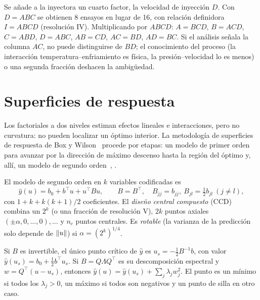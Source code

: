 \begin{ejemplo}\label{ej:fraccion}
Se añade a la inyectora un cuarto factor, la velocidad de inyección $D$. Con $D=ABC$ se obtienen 8 ensayos en lugar de 16, con relación definidora $I=ABCD$ (resolución IV). Multiplicando por $ABCD$: $A=BCD$, $B=ACD$, $C=ABD$, $D=ABC$, $AB=CD$, $AC=BD$, $AD=BC$. Si el análisis señala la columna $AC$, no puede distinguirse de $BD$; el conocimiento del proceso (la interacción temperatura--enfriamiento es física, la presión--velocidad lo es menos) o una segunda fracción deshacen la ambigüedad.
\end{ejemplo}

\section{Superficies de respuesta}

Los factoriales a dos niveles estiman efectos lineales e interacciones, pero no curvatura: no pueden localizar un óptimo interior. La metodología de superficies de respuesta de Box y Wilson~\cite{boxwilson} procede por etapas: un modelo de primer orden para avanzar por la dirección de máximo descenso hasta la región del óptimo y, allí, un modelo de segundo orden~\cite[§11.1–11.3]{montgomery}, \cite[lección~11]{psu503}.

\begin{definicion}\label{def:ccd}
El modelo de segundo orden en $k$ variables codificadas es
\[
\hat y(u)=b_0+b^\top u+u^\top B u,\qquad B=B^\top,\quad B_{jj}=b_{jj},\ B_{jl}=\tfrac12 b_{jl}\ (j\ne l),
\]
con $1+k+k(k+1)/2$ coeficientes. El \emph{diseño central compuesto} (CCD) combina un $2^k$ (o una fracción de resolución V), $2k$ puntos axiales $(\pm\alpha,0,\dots,0),\dots$ y $n_c$ puntos centrales. Es \emph{rotable} (la varianza de la predicción solo depende de $\lVert u\rVert$) si $\alpha=(2^k)^{1/4}$.
\end{definicion}

\begin{proposicion}\label{prop:estacionario}
Si $B$ es invertible, el único punto crítico de $\hat y$ es $u_s=-\tfrac12B^{-1}b$, con valor $\hat y(u_s)=b_0+\tfrac12 b^\top u_s$. Si $B=Q\Lambda Q^\top$ es su descomposición espectral y $w=Q^\top(u-u_s)$, entonces $\hat y(u)=\hat y(u_s)+\sum_j\lambda_jw_j^2$. El punto es un mínimo si todos los $\lambda_j>0$, un máximo si todos son negativos y un punto de silla en otro caso.
\end{proposicion}

